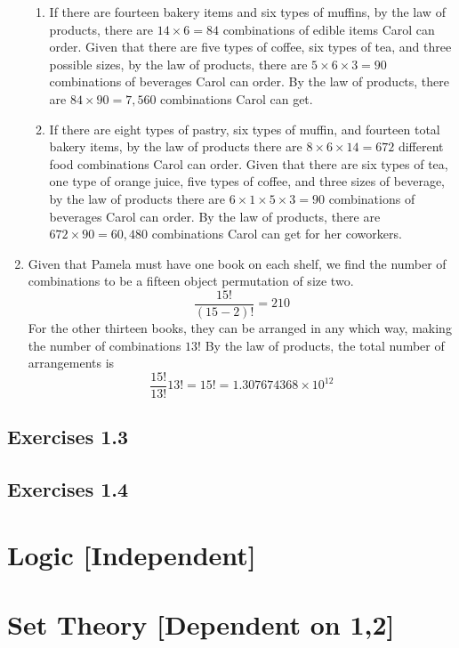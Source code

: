 \documentclass[a4paper,12pt]{article}
\theoremstyle{definition}
\theoremstyle{remark}
\begin{document}
\begin{enumerate}
\begin{enumerate}
    \item If there are fourteen bakery items and six types of muffins, by the law of products, there are $14\times6=84$ combinations of edible items Carol can order. Given that there are five types of coffee, six types of tea, and three possible sizes, by the law of products, there are $5\times6\times3=90$ combinations of beverages Carol can order. By the law of products, there are $84\times90=7,560$ combinations Carol can get.
    \item If there are eight types of pastry, six types of muffin, and fourteen total bakery items, by the law of products there are $8\times6\times14=672$ different food combinations Carol can order. Given that there are six types of tea, one type of orange juice, five types of coffee, and three sizes of beverage, by the law of products there are $6\times 1\times 5\times 3=90$ combinations of beverages Carol can order. By the law of products, there are $672\times90=60,480$ combinations Carol can get for her coworkers.
\end{enumerate}
\item Given that Pamela must have one book on each shelf, we find the number of combinations to be a fifteen object permutation of size two. \begin{equation*}
    \frac{15!}{(15-2)!}=210
\end{equation*} For the other thirteen books, they can be arranged in any which way, making the number of combinations $13!$ By the law of products, the total number of arrangements is \begin{equation*}
    \frac{15!}{13!}13!=15!=1.307674368\times10^{12}
\end{equation*}
\end{enumerate}

\subsection{Exercises 1.3}
\subsection{Exercises 1.4}
\section{Logic [Independent]}
\section{Set Theory [Dependent on 1,2]}
\end{document}
